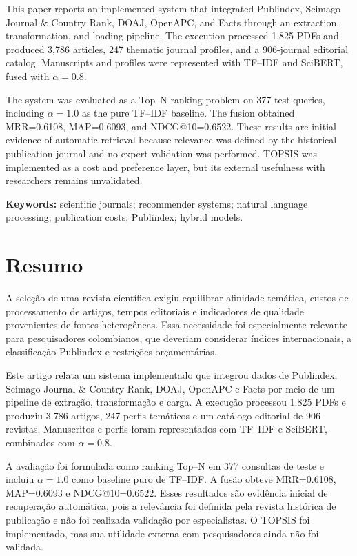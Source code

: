 \documentclass[12pt,a4paper]{article}
\begin{document}
This paper reports an implemented system that integrated Publindex, Scimago Journal \& Country Rank, DOAJ, OpenAPC, and Facts through an extraction, transformation, and loading pipeline. The execution processed 1,825 PDFs and produced 3,786 articles, 247 thematic journal profiles, and a 906-journal editorial catalog. Manuscripts and profiles were represented with TF--IDF and SciBERT, fused with $\alpha=0.8$.

The system was evaluated as a Top--N ranking problem on 377 test queries, including $\alpha=1.0$ as the pure TF--IDF baseline. The fusion obtained MRR=0.6108, MAP=0.6093, and NDCG@10=0.6522. These results are initial evidence of automatic retrieval because relevance was defined by the historical publication journal and no expert validation was performed. TOPSIS was implemented as a cost and preference layer, but its external usefulness with researchers remains unvalidated.

\textbf{Keywords:} scientific journals; recommender systems; natural language processing; publication costs; Publindex; hybrid models.

\section*{Resumo}
A seleção de uma revista científica exigiu equilibrar afinidade temática, custos de processamento de artigos, tempos editoriais e indicadores de qualidade provenientes de fontes heterogêneas. Essa necessidade foi especialmente relevante para pesquisadores colombianos, que deveriam considerar índices internacionais, a classificação Publindex e restrições orçamentárias.

Este artigo relata um sistema implementado que integrou dados de Publindex, Scimago Journal \& Country Rank, DOAJ, OpenAPC e Facts por meio de um pipeline de extração, transformação e carga. A execução processou 1.825 PDFs e produziu 3.786 artigos, 247 perfis temáticos e um catálogo editorial de 906 revistas. Manuscritos e perfis foram representados com TF--IDF e SciBERT, combinados com $\alpha=0.8$.

A avaliação foi formulada como ranking Top--N em 377 consultas de teste e incluiu $\alpha=1.0$ como baseline puro de TF--IDF. A fusão obteve MRR=0.6108, MAP=0.6093 e NDCG@10=0.6522. Esses resultados são evidência inicial de recuperação automática, pois a relevância foi definida pela revista histórica de publicação e não foi realizada validação por especialistas. O TOPSIS foi implementado, mas sua utilidade externa com pesquisadores ainda não foi validada.
\end{document}
